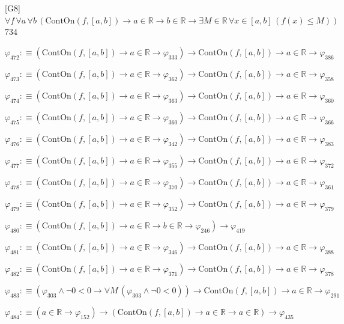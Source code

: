 \begin{fullproof}{[G8]}{$\forall f\,\forall a\,\forall b\,(\mathrm{ContOn}(f,[a,b]) \to a \in \mathbb{R} \to b \in \mathbb{R} \to \exists M \in \mathbb{R}\,\forall x \in [a,b]\,(f(x) \leq M))$}{734}
\begin{abbrevlist}
\item $\varphi_{472} :\equiv (\mathrm{ContOn}(f,[a,b]) \to a \in \mathbb{R} \to \varphi_{333}) \to \mathrm{ContOn}(f,[a,b]) \to a \in \mathbb{R} \to \varphi_{386}$
\item $\varphi_{473} :\equiv (\mathrm{ContOn}(f,[a,b]) \to a \in \mathbb{R} \to \varphi_{362}) \to \mathrm{ContOn}(f,[a,b]) \to a \in \mathbb{R} \to \varphi_{358}$
\item $\varphi_{474} :\equiv (\mathrm{ContOn}(f,[a,b]) \to a \in \mathbb{R} \to \varphi_{363}) \to \mathrm{ContOn}(f,[a,b]) \to a \in \mathbb{R} \to \varphi_{360}$
\item $\varphi_{475} :\equiv (\mathrm{ContOn}(f,[a,b]) \to a \in \mathbb{R} \to \varphi_{360}) \to \mathrm{ContOn}(f,[a,b]) \to a \in \mathbb{R} \to \varphi_{366}$
\item $\varphi_{476} :\equiv (\mathrm{ContOn}(f,[a,b]) \to a \in \mathbb{R} \to \varphi_{342}) \to \mathrm{ContOn}(f,[a,b]) \to a \in \mathbb{R} \to \varphi_{383}$
\item $\varphi_{477} :\equiv (\mathrm{ContOn}(f,[a,b]) \to a \in \mathbb{R} \to \varphi_{355}) \to \mathrm{ContOn}(f,[a,b]) \to a \in \mathbb{R} \to \varphi_{372}$
\item $\varphi_{478} :\equiv (\mathrm{ContOn}(f,[a,b]) \to a \in \mathbb{R} \to \varphi_{370}) \to \mathrm{ContOn}(f,[a,b]) \to a \in \mathbb{R} \to \varphi_{361}$
\item $\varphi_{479} :\equiv (\mathrm{ContOn}(f,[a,b]) \to a \in \mathbb{R} \to \varphi_{352}) \to \mathrm{ContOn}(f,[a,b]) \to a \in \mathbb{R} \to \varphi_{379}$
\item $\varphi_{480} :\equiv (\mathrm{ContOn}(f,[a,b]) \to a \in \mathbb{R} \to b \in \mathbb{R} \to \varphi_{246}) \to \varphi_{419}$
\item $\varphi_{481} :\equiv (\mathrm{ContOn}(f,[a,b]) \to a \in \mathbb{R} \to \varphi_{346}) \to \mathrm{ContOn}(f,[a,b]) \to a \in \mathbb{R} \to \varphi_{388}$
\item $\varphi_{482} :\equiv (\mathrm{ContOn}(f,[a,b]) \to a \in \mathbb{R} \to \varphi_{371}) \to \mathrm{ContOn}(f,[a,b]) \to a \in \mathbb{R} \to \varphi_{378}$
\item $\varphi_{483} :\equiv (\varphi_{303} \land \neg 0 < 0 \to \forall M\,(\varphi_{303} \land \neg 0 < 0)) \to \mathrm{ContOn}(f,[a,b]) \to a \in \mathbb{R} \to \varphi_{291}$
\item $\varphi_{484} :\equiv (a \in \mathbb{R} \to \varphi_{152}) \to (\mathrm{ContOn}(f,[a,b]) \to a \in \mathbb{R} \to a \in \mathbb{R}) \to \varphi_{435}$

\end{abbrevlist}
\end{fullproof}
